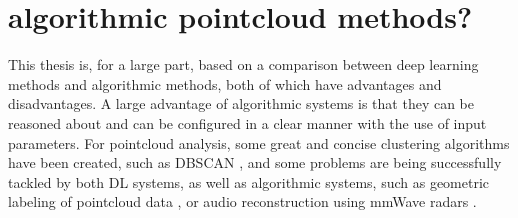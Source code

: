\section{algorithmic pointcloud methods?}
\label{section: background - algorithmic pointcloud methods}

This thesis is, for a large part, based on a comparison between deep learning methods and algorithmic methods, both of which have advantages and disadvantages.
A large advantage of algorithmic systems is that they can be reasoned about and can be configured in a clear manner with the use of input parameters.
For pointcloud analysis, some great and concise clustering algorithms have been created, such as DBSCAN \cite{ester1996dbscan}, and some problems are being successfully tackled by both DL systems, as well as algorithmic systems, such as geometric labeling of pointcloud data \cite{poux2019voxel}, or audio reconstruction using mmWave radars \cite{li2025acoustic}.




